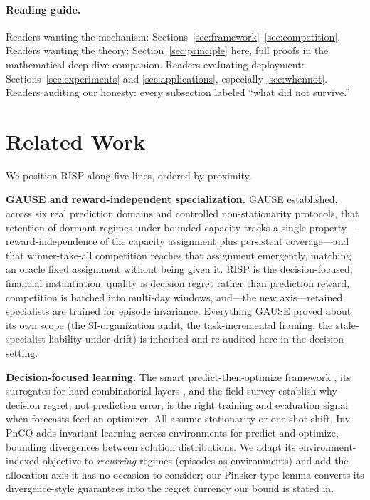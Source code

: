 \documentclass[10pt]{article}
\newcommand{\nm}{\textsc{RISP}}
\begin{document}
\paragraph{Reading guide.} Readers wanting the mechanism:
Sections~\ref{sec:framework}--\ref{sec:competition}. Readers wanting the
theory: Section~\ref{sec:principle} here, full proofs in the mathematical
deep-dive companion. Readers evaluating deployment:
Sections~\ref{sec:experiments} and \ref{sec:applications}, especially
\ref{sec:whennot}. Readers auditing our honesty: every subsection labeled
``what did not survive.''

\section{Related Work}

We position \nm{} along five lines, ordered by proximity.

\textbf{GAUSE and reward-independent specialization.} GAUSE
\cite{li2026gause} established, across six real prediction domains and
controlled non-stationarity protocols, that retention of dormant regimes
under bounded capacity tracks a single property---reward-independence of
the capacity assignment plus persistent coverage---and that winner-take-all
competition reaches that assignment emergently, matching an oracle fixed
assignment without being given it. \nm{} is the decision-focused,
financial instantiation: quality is decision regret rather than prediction
reward, competition is batched into multi-day windows, and---the new
axis---retained specialists are trained for episode invariance. Everything
GAUSE proved about its own scope (the SI-organization audit, the
task-incremental framing, the stale-specialist liability under drift) is
inherited and re-audited here in the decision setting.

\textbf{Decision-focused learning.} The smart predict-then-optimize
framework \cite{elmachtoub2022smart}, its surrogates for hard
combinatorial layers \cite{mandi2020smart, shah2022lodl}, and the field
survey \cite{mandi2024decision} establish why decision regret, not
prediction error, is the right training and evaluation signal when
forecasts feed an optimizer. All assume stationarity or one-shot shift.
Inv-PnCO \cite{yan2026invpnco} adds invariant learning across environments
for predict-and-optimize, bounding divergences between solution
distributions. We adapt its environment-indexed objective to
\emph{recurring} regimes (episodes as environments) and add the
allocation axis it has no occasion to consider; our Pinsker-type lemma
converts its divergence-style guarantees into the regret currency our
bound is stated in.
\end{document}
